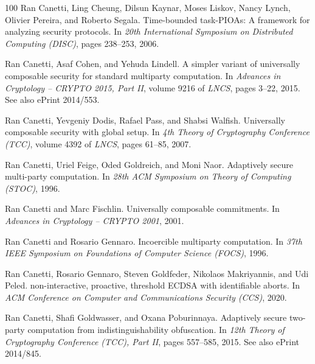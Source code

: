 \documentclass[11pt,a4paper]{article}
\begin{document}
\begin{thebibliography}{100}
Ran Canetti, Ling Cheung, Dilsun Kaynar, Moses Liskov, Nancy Lynch, Olivier
  Pereira, and Roberto Segala.
\newblock Time-bounded task-{PIOA}s: A framework for analyzing security
  protocols.
\newblock In {\em 20th International Symposium on Distributed Computing
  (DISC)}, pages 238--253, 2006.

Ran Canetti, Asaf Cohen, and Yehuda Lindell.
\newblock A simpler variant of universally composable security for standard
  multiparty computation.
\newblock In {\em Advances in Cryptology -- CRYPTO 2015, Part II}, volume 9216
  of {\em LNCS}, pages 3--22, 2015.
\newblock See also ePrint 2014/553.

Ran Canetti, Yevgeniy Dodis, Rafael Pass, and Shabsi Walfish.
\newblock Universally composable security with global setup.
\newblock In {\em 4th Theory of Cryptography Conference (TCC)}, volume 4392 of
  {\em LNCS}, pages 61--85, 2007.

Ran Canetti, Uriel Feige, Oded Goldreich, and Moni Naor.
\newblock Adaptively secure multi-party computation.
\newblock In {\em 28th ACM Symposium on Theory of Computing (STOC)}, 1996.

Ran Canetti and Marc Fischlin.
\newblock Universally composable commitments.
\newblock In {\em Advances in Cryptology -- CRYPTO 2001}, 2001.

Ran Canetti and Rosario Gennaro.
\newblock Incoercible multiparty computation.
\newblock In {\em 37th IEEE Symposium on Foundations of Computer Science
  (FOCS)}, 1996.

Ran Canetti, Rosario Gennaro, Steven Goldfeder, Nikolaos Makriyannis, and Udi
  Peled.
 non-interactive, proactive, threshold {ECDSA} with identifiable
  aborts.
\newblock In {\em ACM Conference on Computer and Communications Security
  (CCS)}, 2020.

Ran Canetti, Shafi Goldwasser, and Oxana Poburinnaya.
\newblock Adaptively secure two-party computation from indistinguishability
  obfuscation.
\newblock In {\em 12th Theory of Cryptography Conference (TCC), Part II}, pages
  557--585, 2015.
\newblock See also ePrint 2014/845.


\end{thebibliography}
\end{document}
